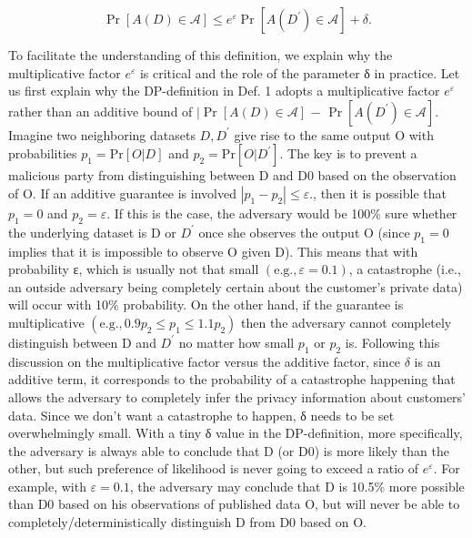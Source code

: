 \[
\operatorname * {P r} [ A (D) \in \mathcal {A} ] \leq e ^ {\varepsilon} \operatorname * {P r} [ A (D ^ {\prime}) \in \mathcal {A} ] + \delta .
\]

To facilitate the understanding of this definition, we explain why the multiplicative factor \(e ^ { \varepsilon }\) is critical and the role of the parameter δ in practice. Let us first explain why the DP-definition in Def. 1 adopts a multiplicative factor \(e ^ { \varepsilon }\) rather than an additive bound of \(| \operatorname* { P r } [ A ( D ) \in { \mathcal { A } } ]\) − \(\operatorname* { P r } [ A ( D ^ { \prime } ) \in { \mathcal { A } } ]\). Imagine two neighboring datasets \(D , D ^ { \prime }\) give rise to the same output O with probabilities \(p _ { 1 } = \mathrm { P r } [ O | D ]\) and \(p _ { 2 } = \mathrm { P r } [ O | D ^ { \prime } ]\). The key is to prevent a malicious party from distinguishing between D and D0 based on the observation of O. If an additive guarantee is involved \(| p _ { 1 } - p _ { 2 } | \leq \varepsilon .\), then it is possible that \(p _ { 1 } = 0\) and \(p _ { 2 } = \varepsilon\). If this is the case, the adversary would be 100\% sure whether the underlying dataset is D or \(D ^ { \prime }\) once she observes the output O (since \(p _ { 1 } = 0\) implies that it is impossible to observe O given D). This means that with probability ε, which is usually not that small \(( \mathrm { e . g . } , \varepsilon = 0 . 1 )\), a catastrophe (i.e., an outside adversary being completely certain about the customer's private data) will occur with 10\% probability. On the other hand, if the guarantee is multiplicative \(( \mathrm { e . g . } , 0 . 9 p _ { 2 } \leq p _ { 1 } \leq 1 . 1 p _ { 2 } )\) then the adversary cannot completely distinguish between D and \(D ^ { \prime }\) no matter how small \(p _ { 1 }\) or \(p _ { 2 }\) is. Following this discussion on the multiplicative factor versus the additive factor, since \(\delta\) is an additive term, it corresponds to the probability of a catastrophe happening that allows the adversary to completely infer the privacy information about customers' data. Since we don't want a catastrophe to happen, δ needs to be set overwhelmingly small. With a tiny δ value in the DP-definition, more specifically, the adversary is always able to conclude that D (or D0) is more likely than the other, but such preference of likelihood is never going to exceed a ratio of \(e ^ { \varepsilon }\). For example, with \(\varepsilon = 0 . 1\), the adversary may conclude that D is 10.5\% more possible than D0 based on his observations of published data O, but will never be able to completely/deterministically distinguish D from D0 based on O.

